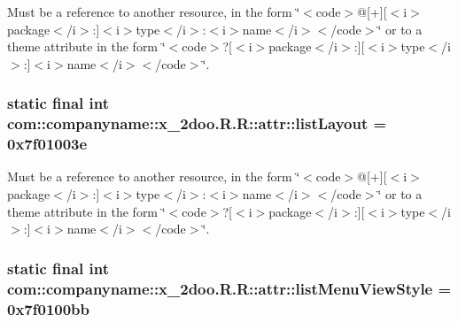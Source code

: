 Must be a reference to another resource, in the form \char`\"{}$<$code$>$@\mbox{[}+\mbox{]}\mbox{[}$<$i$>$package$<$/i$>$:\mbox{]}$<$i$>$type$<$/i$>$:$<$i$>$name$<$/i$>$$<$/code$>$\char`\"{} or to a theme attribute in the form \char`\"{}$<$code$>$?\mbox{[}$<$i$>$package$<$/i$>$:\mbox{]}\mbox{[}$<$i$>$type$<$/i$>$:\mbox{]}$<$i$>$name$<$/i$>$$<$/code$>$\char`\"{}. \hypertarget{classcom_1_1companyname_1_1x__2doo_1_1_r_1_1attr_b929b18c30d5976d6e53aae86ad341a2}{
\subsubsection[{listLayout}]{\setlength{\rightskip}{0pt plus 5cm}static final int com::companyname::x\_\-2doo.R.R::attr::listLayout = 0x7f01003e}}
\label{classcom_1_1companyname_1_1x__2doo_1_1_r_1_1attr_b929b18c30d5976d6e53aae86ad341a2}


Must be a reference to another resource, in the form \char`\"{}$<$code$>$@\mbox{[}+\mbox{]}\mbox{[}$<$i$>$package$<$/i$>$:\mbox{]}$<$i$>$type$<$/i$>$:$<$i$>$name$<$/i$>$$<$/code$>$\char`\"{} or to a theme attribute in the form \char`\"{}$<$code$>$?\mbox{[}$<$i$>$package$<$/i$>$:\mbox{]}\mbox{[}$<$i$>$type$<$/i$>$:\mbox{]}$<$i$>$name$<$/i$>$$<$/code$>$\char`\"{}. \hypertarget{classcom_1_1companyname_1_1x__2doo_1_1_r_1_1attr_0e69a8ad9db1f4508c2656f05d026ede}{
\subsubsection[{listMenuViewStyle}]{\setlength{\rightskip}{0pt plus 5cm}static final int com::companyname::x\_\-2doo.R.R::attr::listMenuViewStyle = 0x7f0100bb}}
\label{classcom_1_1companyname_1_1x__2doo_1_1_r_1_1attr_0e69a8ad9db1f4508c2656f05d026ede}


